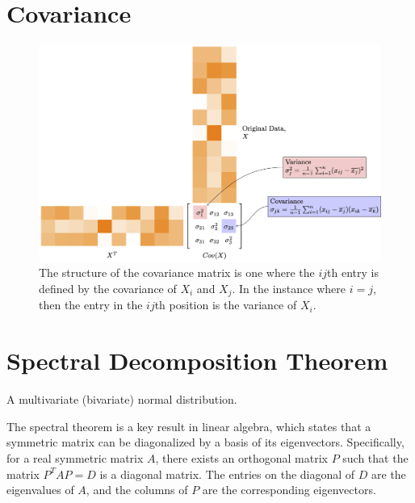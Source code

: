 \documentclass{tufte-handout}
\begin{document}
\section{Covariance}

\begin{figure}
    \includegraphics[width=5in]{figures/covariance/covariance.png}
    
    \caption{The structure of the covariance matrix is one where
    the $ij$th entry is defined by the covariance of $X_i$ and $X_j$. In the instance where $i=j$, then the entry in the $ij$th position is the variance of $X_i$.}
    \label{fig:covariance}
\end{figure}

\section{Spectral Decomposition Theorem}

\begin{marginfigure}
\caption{A multivariate (bivariate) normal distribution.}
\end{marginfigure}


The spectral theorem is a key result in linear algebra, which states that a symmetric matrix can be diagonalized by a basis of its eigenvectors. Specifically, for a real symmetric matrix $A$, there exists an orthogonal matrix $P$ such that the matrix $P^{T}AP = D$ is a diagonal matrix. The entries on the diagonal of $D$ are the eigenvalues of $A$, and the columns of $P$ are the corresponding eigenvectors.
\end{document}
